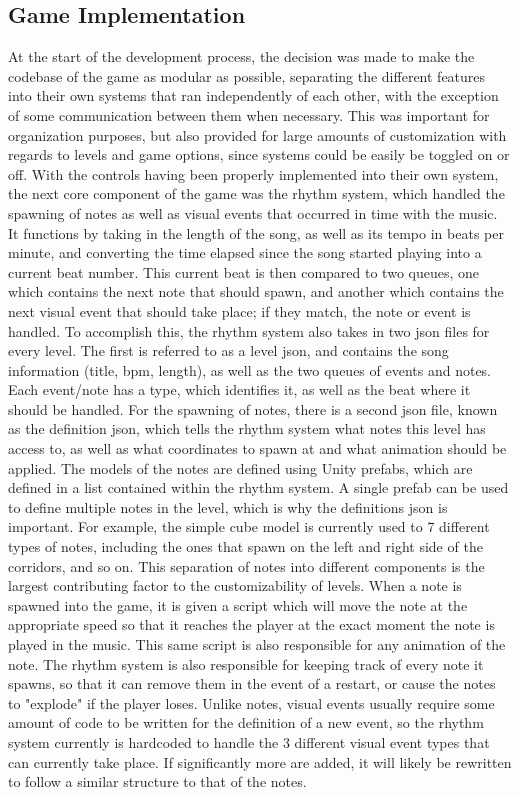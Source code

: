 \documentclass[10pt,twocolumn]{article}
\begin{document}
\subsection{Game Implementation}
At the start of the development process, the decision was made to make the codebase of the game as modular as possible, separating the different features into their own systems that ran independently of each other, with the exception of some communication between them when necessary. This was important for organization purposes, but also provided for large amounts of customization with regards to levels and game options, since systems could be easily be toggled on or off. With the controls having been properly implemented into their own system, the next core component of the game was the rhythm system, which handled the spawning of notes as well as visual events that occurred in time with the music. It functions by taking in the length of the song, as well as its tempo in beats per minute, and converting the time elapsed since the song started playing into a current beat number. This current beat is then compared to two queues, one which contains the next note that should spawn, and another which contains the next visual event that should take place; if they match, the note or event is handled. To accomplish this, the rhythm system also takes in two json files for every level. The first is referred to as a level json, and contains the song information (title, bpm, length), as well as the two queues of events and notes. Each event/note has a type, which identifies it, as well as the beat where it should be handled. For the spawning of notes, there is a second json file, known as the definition json, which tells the rhythm system what notes this level has access to, as well as what coordinates to spawn at and what animation should be applied. The models of the notes are defined using Unity prefabs, which are defined in a list contained within the rhythm system. A single prefab can be used to define multiple notes in the level, which is why the definitions json is important. For example, the simple cube model is currently used to 7 different types of notes, including the ones that spawn on the left and right side of the corridors, and so on. This separation of notes into different components is the largest contributing factor to the customizability of levels. When a note is spawned into the game, it is given a script which will move the note at the appropriate speed so that it reaches the player at the exact moment the note is played in the music. This same script is also responsible for any animation of the note. The rhythm system is also responsible for keeping track of every note it spawns, so that it can remove them in the event of a restart, or cause the notes to "explode" if the player loses. Unlike notes, visual events usually require some amount of code to be written for the definition of a new event, so the rhythm system currently is hardcoded to handle the 3 different visual event types that can currently take place. If significantly more are added, it will likely be rewritten to follow a similar structure to that of the notes.
\end{document}
